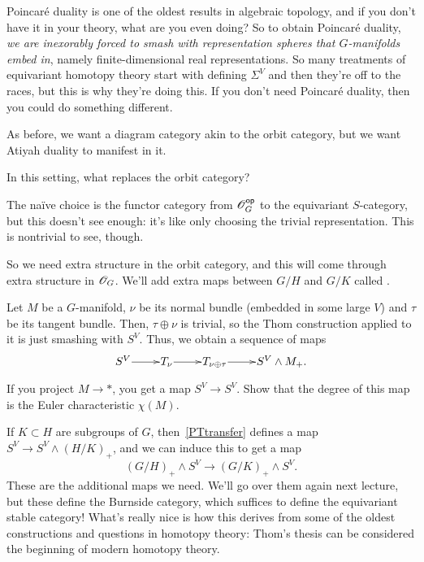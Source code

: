Poincaré duality is one of the oldest results in algebraic topology, and if you don't have it in your theory, what
are you even doing? So to obtain Poincaré duality, \emph{we are inexorably forced to smash with representation
spheres that $G$-manifolds embed in}, namely finite-dimensional real representations. So many treatments of
equivariant homotopy theory start with defining $\Sigma^V$ and then they're off to the races, but this is why
they're doing this. If you don't need Poincaré duality, then you could do something different.

As before, we want a diagram category akin to the orbit category, but we want Atiyah duality to manifest in it.
\begin{ques}
In this setting, what replaces the orbit category?
\end{ques}
The naïve choice is the functor category from $\mathscr O_G^{\mathsf{op}}$ to the equivariant $S$-category, but this doesn't see
enough: it's like only choosing the trivial representation. This is nontrivial to see, though.

So we need extra structure in the orbit category, and this will come through extra structure in $\mathscr O_G$. We'll add
extra maps between $G/H$ and $G/K$ called .

Let $M$ be a $G$-manifold, $\nu$ be its normal bundle (embedded in some large $V$) and $\tau$ be its tangent
bundle. Then, $\tau\oplus\nu$ is trivial, so the Thom construction applied to it is just smashing with $S^V$. Thus,
we obtain a sequence of maps
\begin{equation}
\label{PTtransfer}
\xymatrix@1{
	S^V\ar[r] & T_\nu\ar[r] & T_{\nu\oplus\tau}\ar[r] & S^V\wedge M_+.
}
\end{equation}
\begin{ex}
If you project $M\to *$, you get a map $S^V\to S^V$. Show that the degree of this map is the Euler characteristic
$\chi(M)$.
\end{ex}
If $K\subset H$ are subgroups of $G$, then~\eqref{PTtransfer} defines a map $S^V\to S^V\wedge (H/K)_+$, and we can
induce this to get a map
\[(G/H)_+\wedge S^V\longrightarrow (G/K)_+\wedge S^V.\]
These are the additional maps we need. We'll go over them again next lecture, but these define the Burnside
category, which suffices to define the equivariant stable category! What's really nice is how this derives from
some of the oldest constructions and questions in homotopy theory: Thom's thesis can be considered the beginning of
modern homotopy theory.

